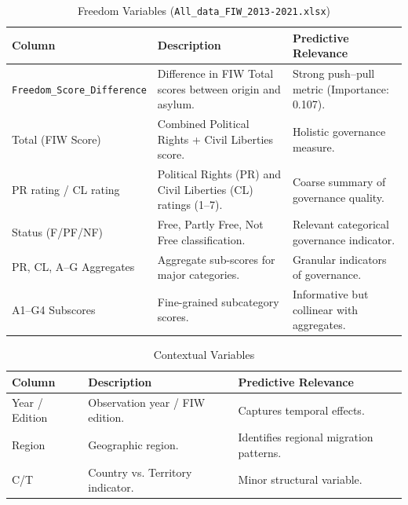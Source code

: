 \documentclass{article}
\theoremstyle{plain}
\theoremstyle{definition}
\theoremstyle{remark}
\begin{document}
\begin{table}[!htbp]
\caption{Freedom Variables (\texttt{All\_data\_FIW\_2013-2021.xlsx})}
\label{tab:data_dict_freedom}
\centering
\begin{scriptsize}
\renewcommand{\arraystretch}{1.25}
\begin{tabularx}{\columnwidth}{|X|X|X|}
\hline
\textbf{Column} & \textbf{Description} & \textbf{Predictive Relevance} \\
\hline
\texttt{Freedom\_\allowbreak Score\_\allowbreak Difference} 
& Difference in FIW Total scores between origin and asylum. 
& Strong push–pull metric (Importance: 0.107). \\
\hline
Total (FIW Score) 
& Combined Political Rights + Civil Liberties score. 
& Holistic governance measure. \\
\hline
PR rating / CL rating 
& Political Rights (PR) and Civil Liberties (CL) ratings (1–7). 
& Coarse summary of governance quality. \\
\hline
Status (F/PF/NF) 
& Free, Partly Free, Not Free classification. 
& Relevant categorical governance indicator. \\
\hline
PR, CL, A–G Aggregates 
& Aggregate sub-scores for major categories. 
& Granular indicators of governance. \\
\hline
A1–G4 Subscores 
& Fine-grained subcategory scores. 
& Informative but collinear with aggregates. \\
\hline
\end{tabularx}
\end{scriptsize}
\end{table}


\begin{table}[!htbp]
\caption{Contextual Variables}
\label{tab:data_dict_context}
\centering
\begin{scriptsize}
\renewcommand{\arraystretch}{1.25}
\begin{tabularx}{\columnwidth}{|X|X|X|}
\hline
\textbf{Column} & \textbf{Description} & \textbf{Predictive Relevance} \\
\hline
Year / Edition & Observation year / FIW edition. & Captures temporal effects. \\
\hline
Region & Geographic region. & Identifies regional migration patterns. \\
\hline
C/T & Country vs. Territory indicator. & Minor structural variable. \\
\hline
\end{tabularx}
\end{scriptsize}
\end{table}
\end{document}
